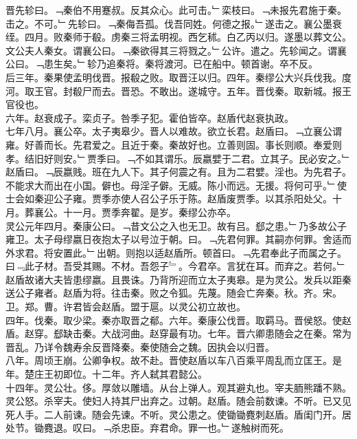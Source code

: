 \documentclass{zhvt-classic}
\begin{document}
\hspace*{2em}晋先轸曰。﹁秦伯不用蹇叔。反其众心。此可击。﹂栾枝曰。﹁未报先君施于秦。击之。不可。﹂先轸曰。﹁秦侮吾孤。伐吾同姓。何德之报。﹂遂击之。襄公墨衰绖。四月。败秦师于殽。虏秦三将孟明视。西乞秫。白乙丙以归。遂墨以葬文公。文公夫人秦女。谓襄公曰。﹁秦欲得其三将戮之。﹂公许。遣之。先轸闻之。谓襄公曰。﹁患生矣。﹂轸乃追秦将。秦将渡河。已在船中。顿首谢。卒不反。\\
\hspace*{2em}后三年。秦果使孟明伐晋。报殽之败。取晋汪以归。四年。秦缪公大兴兵伐我。度河。取王官。封殽尸而去。晋恐。不敢出。遂城守。五年。晋伐秦。取新城。报王官役也。\\
\hspace*{2em}六年。赵衰成子。栾贞子。咎季子犯。霍伯皆卒。赵盾代赵衰执政。\\
\hspace*{2em}七年八月。襄公卒。太子夷皋少。晋人以难故。欲立长君。赵盾曰。﹁立襄公谓雍。好善而长。先君爱之。且近于秦。秦故好也。立善则固。事长则顺。奉爱则孝。结旧好则安。﹂贾季曰。﹁不如其谓乐。辰嬴嬖于二君。立其子。民必安之。﹂赵盾曰。﹁辰嬴贱。班在九人下。其子何震之有。且为二君嬖。淫也。为先君子。不能求大而出在小国。僻也。母淫子僻。无威。陈小而远。无援。将何可乎。﹂使士会如秦迎公子雍。贾季亦使人召公子乐于陈。赵盾废贾季。以其杀阳处父。十月。葬襄公。十一月。贾季奔翟。是岁。秦缪公亦卒。\\
\hspace*{2em}灵公元年四月。秦康公曰。﹁昔文公之入也无卫。故有吕。郄之患。﹂乃多故公子雍卫。太子母缪嬴日夜抱太子以号泣于朝。曰。﹁先君何罪。其嗣亦何罪。舍适而外求君。将安置此。﹂出朝。则抱以适赵盾所。顿首曰。﹁先君奉此子而属之子。曰﹃此子材。吾受其赐。不材。吾怨子﹄。今君卒。言犹在耳。而弃之。若何。﹂赵盾故诸大夫皆患缪嬴。且畏诛。乃背所迎而立太子夷皋。是为灵公。发兵以距秦送公子雍者。赵盾为将。往击秦。败之令狐。先蔑。随会亡奔秦。秋。齐。宋。卫。郑。曹。许君皆会赵盾。盟于扈。以灵公初立故也。\\
\hspace*{2em}四年。伐秦。取少梁。秦亦取晋之郩。六年。秦康公伐晋。取羁马。晋侯怒。使赵盾。赵穿。郄缺击秦。大战河曲。赵穿最有功。七年。晋六卿患随会之在秦。常为晋乱。乃详令魏寿余反晋降秦。秦使随会之魏。因执会以归晋。\\
\hspace*{2em}八年。周顷王崩。公卿争权。故不赴。晋使赵盾以车八百乘平周乱而立匡王。是年。楚庄王初即位。十二年。齐人弑其君懿公。\\
\hspace*{2em}十四年。灵公壮。侈。厚敛以雕墙。从台上弹人。观其避丸也。宰夫胹熊蹯不熟。灵公怒。杀宰夫。使妇人持其尸出弃之。过朝。赵盾。随会前数谏。不听。已又见死人手。二人前谏。随会先谏。不听。灵公患之。使锄锄麑刺赵盾。盾闺门开。居处节。锄麑退。叹曰。﹁杀忠臣。弃君命。罪一也。﹂遂触树而死。\\
\end{document}
